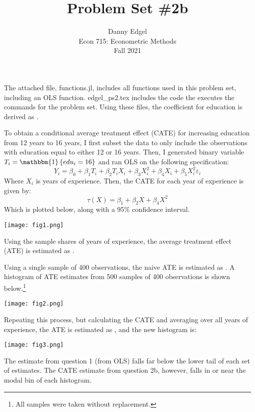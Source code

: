 \documentclass{article}
\newcommand{\one}[1]{\mathbbm{1}\left\{#1\right\}}
\newcommand{\eps}{\varepsilon}
\begin{document}
\title{	Problem Set \#2b }
\author{ 	Danny Edgel 					\\ 
			Econ 715: Econometric Methods	\\
			Fall 2021						
		}
\maketitle\thispagestyle{empty}


\noindent The attached file, functions.jl, includes all functions used in this problem set, including an OLS function. edgel\_ps2.tex includes the code the executes the commands for the problem set. Using these files, the coefficient for education is derived as .

To obtain a conditional average treatment effect (CATE) for increasing education from 12 years to 16 years, I first subset the data to only include the observations with education equal to either 12 or 16 years. Then, I generated binary variable ${T_i = \one{edu_i = 16}}$ and ran OLS on the following specification:\[
    Y_i = \beta_0 + \beta_1T_i + \beta_2T_iX_i + \beta_3X_i^2 + \beta_4X_i + \beta_5X_i^2 \eps_i
\]
Where $X_i$ is years of experience. Then, the CATE for each year of experience is given by:\[
    \tau(X) = \beta_1 + \beta_2X + \beta_4X^2
\]
Which is plotted below, along with a 95\% confidence interval.
\begin{center}
    \texttt{[image: fig1.png]}
\end{center}
Using the sample shares of years of experience, the average treatment effect (ATE) is estimated as . 

Using a single sample of 400 observations, the naive ATE is estimated as . A histogram of ATE estimates from 500 samples of 400 observations is shown below.\footnote{All samples were taken without replacement.}
\begin{center}
    \texttt{[image: fig2.png]}
\end{center}
Repeating this process, but calculating the CATE and averaging over all years of experience, the ATE is estimated as , and the new histogram is:
\begin{center}
    \texttt{[image: fig3.png]}
\end{center}
The estimate from question 1 (from OLS) falls far below the lower tail of each set of estimates. The CATE estimate from question 2b, however, falls in or near the modal bin of each histogram.
\end{document}
